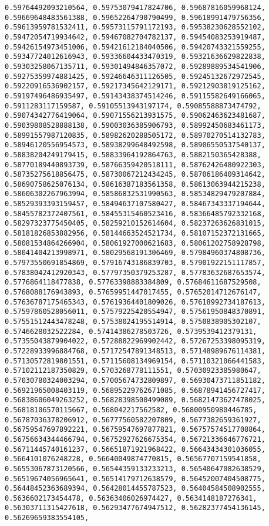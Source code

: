 \documentclass[11pt]{article}
\begin{document}
\begin{Verbatim}[commandchars=\\\{\}]
0.59764492093210564, 0.59753079417824706, 0.59687816059968124, 0.59669648483561388, 0.59652264790790499, 0.59618991479756356, 0.59613959781532411, 0.59573115791172193, 0.59538230628552102, 0.59472054719934642, 0.59467082704782137, 0.59454083253919487, 0.59426154973451006, 0.59421612184040506, 0.59420743321559255, 0.59347724012616943, 0.59336604433470319, 0.59321636629822838, 0.59303258067135711, 0.59301494846357072, 0.59289889534541906, 0.59275359974881425, 0.59246646311126505, 0.59245132672972545, 0.59220916536902157, 0.59217345642129171, 0.59212903819125162, 0.59197496486935497, 0.59143438374514246, 0.59115582649166065, 0.5911283117159587, 0.59105513943197174, 0.59085588873474792, 0.59074342776419064, 0.59071556213931575, 0.59062463623481687, 0.59039808528888138, 0.59003036385906793, 0.58992450683461173, 0.58991557987120835, 0.58982620288505172, 0.58970270514132783, 0.58946120556954573, 0.58938299648492598, 0.58906550537540137, 0.58838204249179415, 0.58833964192864763, 0.5882150365428388, 0.58770189440893739, 0.58766359420518111, 0.58762426480922303, 0.58735275618856475, 0.58730067212434245, 0.58706186409314642, 0.58690758625076134, 0.58616387183561358, 0.58613063944215238, 0.58606302267963994, 0.58586832531990563, 0.58534829479207884, 0.58529393393159457, 0.58494637107580427, 0.58467343337194644, 0.58455782372407561, 0.58455315460523416, 0.58366485792332168, 0.58297323775450405, 0.58259210152614604, 0.58237263626831015, 0.58181826853882956, 0.58144663524521734, 0.58107152372131665, 0.58081534864266904, 0.58061927000621683, 0.58061202758928798, 0.58041404213998971, 0.58029568191306469, 0.57984960374808736, 0.57973550691854869, 0.57916743186839703, 0.57901922151117857, 0.57838042412920343, 0.57797350379253287, 0.57783632687653574, 0.5776864118477838, 0.57763398883384809, 0.57684611687529508, 0.5768088176943893, 0.57659951447017455, 0.57652014712676147, 0.57636787175465343, 0.57619364401809026, 0.57618992734187613, 0.57597860528056011, 0.57579225420554947, 0.57561950848370891, 0.57551512443478248, 0.57538024195514914, 0.5750838905302107, 0.5746628032522284, 0.57414386278503726, 0.5739539412379131, 0.57355043879904022, 0.57288822969902442, 0.57267253398095319, 0.57228933996884768, 0.57172547891348513, 0.57148989676114381, 0.57130572819801551, 0.57115608134969154, 0.57110321066441583, 0.57102112187350829, 0.5703268778111551, 0.57030923385980647, 0.57030780324003294, 0.57005674732809897, 0.56930473711851182, 0.56921965008403119, 0.56895229762671085, 0.56878941456727417, 0.56838606049263252, 0.56828398500499089, 0.56821473627478025, 0.56818106570115667, 0.568042217562582, 0.56800950980446785, 0.56787036378206912, 0.56777560582207809, 0.5677382659361927, 0.56759547697892221, 0.56759547697877821, 0.56757574517708864, 0.56756634344466794, 0.56752927626675354, 0.56721336646776721, 0.56711445740161237, 0.56651871921968422, 0.56643434301036055, 0.5664101076248228, 0.56640049874770815, 0.56567707159541858, 0.56553067873120566, 0.56544359133233213, 0.56540647082638529, 0.56519674056965641, 0.56514179712638579, 0.56452007404508775, 0.56448452363689394, 0.56428014455787523, 0.56404584508902555, 0.5636602173454478, 0.56363406026974427, 0.5634148187276341, 0.56303711315427618, 0.56293477674947512, 0.56282377454136145, 0.56269659383554105, 
\end{Verbatim}
\end{document}
